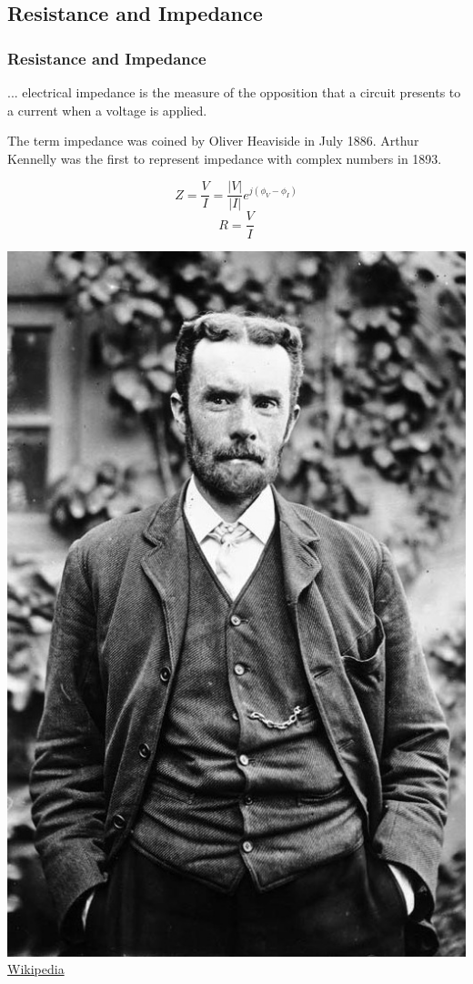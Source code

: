 \documentclass[fleqn]{beamer} %
\newcommand{\sectionIsubsectionIItitle}{Resistance and Impedance}
\begin{document}
		\subsection{\sectionIsubsectionIItitle}\label{sectionIsubsectionII}

			\begin{frame}
				\frametitle{\sectionIsubsectionIItitle}

					\small
					\begin{multicols}{2}

						... electrical {\PN impedance} is the measure of the opposition that a circuit presents to a current when a voltage is applied. \vspc
						
						The term impedance was coined by Oliver Heaviside in July 1886. Arthur Kennelly was the first to represent impedance with complex numbers in 1893.
						
						\[ Z=\frac{V}{I}=\frac{|V|}{|I|}e^{j\left(\phi_V-\phi_I \right)} \] \vspace{2mm}
						\[ R=\frac{V}{I} \]

					\includegraphics[scale=.2]{images/Oliver_Heaviside.jpg}\\
					{\tiny \href{https://en.wikipedia.org/wiki/Oliver_Heaviside}{Wikipedia}}

					\end{multicols}	

		
			\end{frame}
\end{document}
